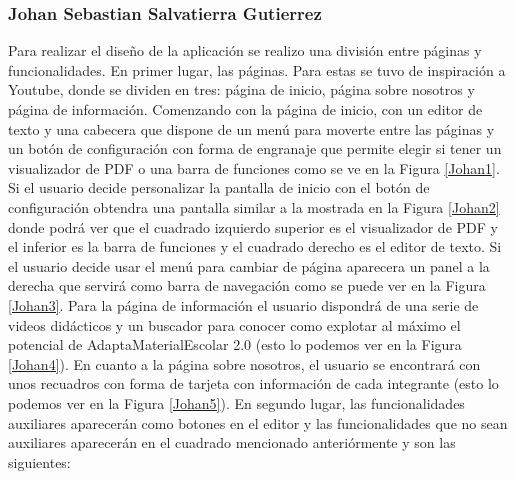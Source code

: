 \subsubsection{Johan Sebastian Salvatierra Gutierrez}
Para realizar el diseño de la aplicación se realizo una división entre páginas y funcionalidades.
En primer lugar, las páginas. Para estas se tuvo de inspiración a Youtube, donde se dividen en tres: página de inicio, página sobre nosotros y página de información. Comenzando con la página de inicio, con un editor de texto y una cabecera que dispone de un menú para moverte entre las páginas y un botón de configuración con forma de engranaje que permite elegir si tener un visualizador de PDF o una barra de funciones como se ve en la Figura \ref{Johan1}. Si el usuario decide personalizar la pantalla de inicio con el botón de configuración obtendra una pantalla similar a la mostrada en la Figura \ref{Johan2} donde podrá ver que el cuadrado izquierdo superior es el visualizador de PDF y el inferior es la barra de funciones y el cuadrado derecho es el editor de texto. Si el usuario decide usar el menú para cambiar de página aparecera un panel a la derecha que servirá como barra de navegación como se puede ver en la Figura \ref{Johan3}. Para la página de información el usuario dispondrá de una serie de videos didácticos y un buscador para conocer como explotar al máximo el potencial de AdaptaMaterialEscolar 2.0 (esto lo podemos ver en la Figura \ref{Johan4}). En cuanto a la página sobre nosotros, el usuario se encontrará con unos recuadros con forma de tarjeta con información de cada integrante (esto lo podemos ver en la Figura \ref{Johan5}).
En segundo lugar, las funcionalidades auxiliares aparecerán  como botones en el editor y las funcionalidades que no sean auxiliares aparecerán en el cuadrado mencionado anteriórmente y son las siguientes:
